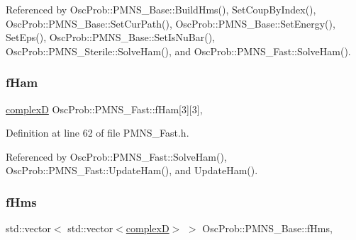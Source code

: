 Referenced by Osc\+Prob\+::\+P\+M\+N\+S\+\_\+\+Base\+::\+Build\+Hms(), Set\+Coup\+By\+Index(), Osc\+Prob\+::\+P\+M\+N\+S\+\_\+\+Base\+::\+Set\+Cur\+Path(), Osc\+Prob\+::\+P\+M\+N\+S\+\_\+\+Base\+::\+Set\+Energy(), Set\+Eps(), Osc\+Prob\+::\+P\+M\+N\+S\+\_\+\+Base\+::\+Set\+Is\+Nu\+Bar(), Osc\+Prob\+::\+P\+M\+N\+S\+\_\+\+Sterile\+::\+Solve\+Ham(), and Osc\+Prob\+::\+P\+M\+N\+S\+\_\+\+Fast\+::\+Solve\+Ham().

\mbox{\label{classOscProb_1_1PMNS__Fast_a94286a881bc53dd512a89d548346b611}} 
\subsubsection{\texorpdfstring{f\+Ham}{fHam}}
{\footnotesize\ttfamily \hyperlink{EigenPoint_8h_a67ca8e107e20610c3fff78d5e726ece0}{complexD} Osc\+Prob\+::\+P\+M\+N\+S\+\_\+\+Fast\+::f\+Ham\mbox{[}3\mbox{]}\mbox{[}3\mbox{]}\hspace{0.3cm}{\ttfamily [protected]}, {\ttfamily [inherited]}}



Definition at line 62 of file P\+M\+N\+S\+\_\+\+Fast.\+h.



Referenced by Osc\+Prob\+::\+P\+M\+N\+S\+\_\+\+Fast\+::\+Solve\+Ham(), Osc\+Prob\+::\+P\+M\+N\+S\+\_\+\+Fast\+::\+Update\+Ham(), and Update\+Ham().

\mbox{\label{classOscProb_1_1PMNS__Base_acd3c8783e7603081eab316ea4c86c766}} 
\subsubsection{\texorpdfstring{f\+Hms}{fHms}}
{\footnotesize\ttfamily std\+::vector$<$ std\+::vector$<$\hyperlink{EigenPoint_8h_a67ca8e107e20610c3fff78d5e726ece0}{complexD}$>$ $>$ Osc\+Prob\+::\+P\+M\+N\+S\+\_\+\+Base\+::f\+Hms\hspace{0.3cm}{\ttfamily [protected]}, {\ttfamily [inherited]}}



